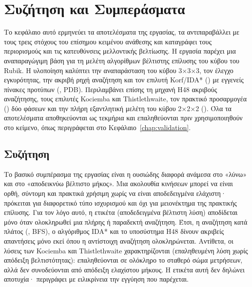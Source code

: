 \chapter{Συζήτηση και Συμπεράσματα}
\label{chap:conclusions}

Το κεφάλαιο αυτό ερμηνεύει τα αποτελέσματα της εργασίας, τα αντιπαραβάλλει με τους τρεις στόχους του επίσημου κειμένου ανάθεσης και καταγράφει τους περιορισμούς και τις κατευθύνσεις μελλοντικής βελτίωσης. Η εργασία παρέχει μια αναπαραγώγιμη βάση για τη μελέτη αλγορίθμων βέλτιστης επίλυσης του κύβου του Rubik. Η υλοποίηση καλύπτει την αναπαράσταση του κύβου 3×3×3, τον έλεγχο εγκυρότητας, την ακριβή ρηχή αναζήτηση και τον επιλυτή Korf/IDA* () με εγγενείς πίνακες προτύπων (, PDB). Περιλαμβάνει επίσης τη μηχανή H48 ακριβούς αναζήτησης, τους επιλυτές Kociemba και Thistlethwaite, τον πρακτικό προσαρμογέα () δύο φάσεων και την πλήρη εξαντλητική μελέτη του κύβου 2×2×2 (). Όλα τα αποτελέσματα αποθηκεύονται ως τεκμήρια και επαληθεύονται πριν χρησιμοποιηθούν στο κείμενο, όπως περιγράφεται στο Κεφάλαιο~\ref{chap:validation}.

\section{Συζήτηση}
\label{sec:conclusions-discussion}

Το βασικό συμπέρασμα της εργασίας είναι η ουσιώδης διαφορά ανάμεσα στο «λύνω» και στο «αποδεικνύω βέλτιστο μήκος». Μια ακολουθία κινήσεων μπορεί να είναι ορθή, σύντομη και πρακτικά χρήσιμη χωρίς να είναι αποδεδειγμένα ελάχιστη· πρόκειται για διαφορετικό τύπο ισχυρισμού και όχι για μειονέκτημα της πρακτικής επίλυσης. Για τον λόγο αυτό, η ετικέτα  (αποδεδειγμένα βέλτιστη λύση) αποδίδεται μόνο όταν ολοκληρωθεί μια πλήρης ή παραδεκτή αναζήτηση. Έτσι, η αναζήτηση κατά πλάτος (, BFS), ο αλγόριθμος IDA* και το υποσύστημα H48 δίνουν ακριβείς απαντήσεις μόνο εκεί όπου η αντίστοιχη αναζήτηση ολοκληρώνεται. Αντίθετα, οι λύσεις των Kociemba και Thistlethwaite χαρακτηρίζονται  (επαληθευμένη λύση χωρίς απόδειξη βελτιστότητας): επαληθεύονται σε ολόκληρο το σταθερό σώμα μετρήσεων, αλλά δεν συνοδεύονται από απόδειξη ελαχίστου μήκους. Η ετικέτα αυτή δεν δηλώνει αποτυχία· περιγράφει με ειλικρίνεια την εγγύηση που παρέχεται.

